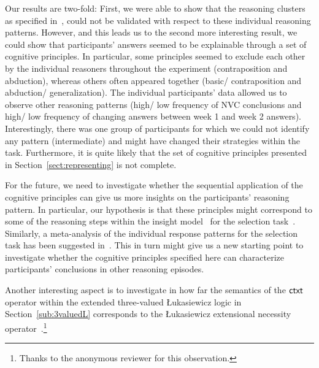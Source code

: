 \documentclass[12pt]{article}
\begin{document}
Our results are two-fold: First, we were able to show that the reasoning clusters as specified in~\cite{declare:2017}, could not be validated
with respect to these individual reasoning patterns. However, and this leads us to the second more interesting result,
we could show that participants' answers seemed to be explainable through a set of cognitive principles. In particular,
some principles seemed to exclude each other by the individual reasoners throughout the experiment (contraposition and abduction), whereas others often appeared together (basic/ contraposition and abduction/ generalization). 
The individual participants' data allowed us to observe other reasoning patterns (high/ low frequency of NVC conclusions and high/ low frequency of changing answers between week 1 and week 2 answers). 
Interestingly, there was one group of participants for which we could not identify any pattern (intermediate)
and might have changed their strategies within the task.
Furthermore, it is quite likely that the set of cognitive principles presented in Section~\ref{sect:representing} is not complete.

For the future, we need to investigate whether the sequential application of the cognitive principles 
can give us more insights on the participants' reasoning pattern. In particular, our hypothesis is that these principles might correspond to some of the reasoning steps within the insight model~\cite{johnsonlaird:1970} for the selection task~\cite{wason:68}. Similarly, a meta-analysis of the individual response patterns for the selection task has been suggested in~\cite{ragni:2017}.
This in turn might give us a new starting point to investigate whether the cognitive principles  specified here can characterize participants' conclusions in other reasoning episodes.

Another interesting aspect is to investigate in how far the semantics of the $\mathsf{ctxt}$ operator within the extended three-valued {\L}ukasiewicz logic in Section~\ref{sub:3valuedL} 
 corresponds to the {\L}ukasiewicz extensional necessity operator~\cite{}.\footnote{Thanks to the
 anonymous reviewer for this observation.}





\end{document}

